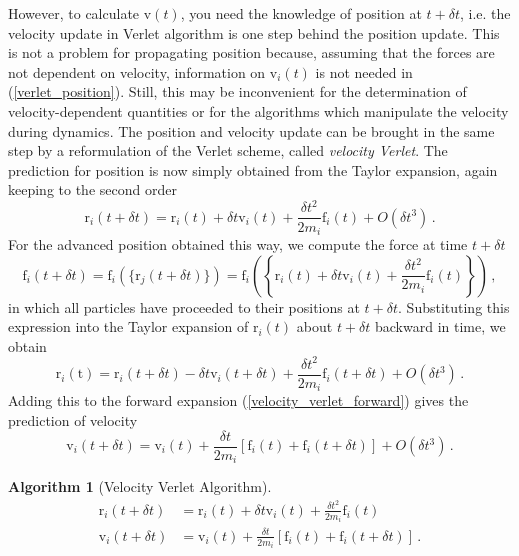 \documentclass{article}
\theoremstyle{plain}\theoremheaderfont{\normalfont\itshape}\theorembodyfont{\rmfamily}\theoremseparator{.}\newtheorem*{rem}{Remark}\newtheorem*{ex}{Example}\newtheorem*{proof}{Proof}\newtheorem*{altp}{Alternative proof}
\theoremstyle{plain}\theoremheaderfont{\normalfont\bfseries}\theorembodyfont{\rmfamily}\theoremseparator{.}\newtheorem{thm}{Theorem}[section]\newtheorem{lem}[thm]{Lemma}\newtheorem{prop}[thm]{Proposition}\newtheorem*{cor}{Corollary}\newtheorem{defn}[thm]{Definition}\newtheorem{clm}[thm]{Claim}\newtheorem{clminproof}{Claim}\newtheorem{alg}[thm]{Algorithm}\newtheorem{hyp}[thm]{Hypothesis}\newtheorem{law}[thm]{Law}
\theoremstyle{break}\theoremheaderfont{\normalfont\itshape}\theorembodyfont{\rmfamily}\theoremseparator{.\medskip}\newtheorem*{proofskip}{Proof}\newtheorem*{exs}{Examples}\newtheorem*{rems}{Remarks}
\theoremstyle{break}\theoremheaderfont{\normalfont\bfseries}\theorembodyfont{\rmfamily}\theoremseparator{.\medskip}\newtheorem{lemskip}[thm]{Lemma}\newtheorem{defnskip}[thm]{Definition}\newtheorem{propskip}[thm]{Proposition}\newtheorem{thmskip}[thm]{Theorem}
\numberwithin{equation}{section}
\newcommand{\vb}[1]{\bm{\mathrm{#1}}}
\begin{document}
    However, to calculate \(\vb{v}(t)\), you need the knowledge of position at \(t+\delta t\), i.e. the velocity update in Verlet algorithm is one step behind the position update. This is not a problem for propagating position because, assuming that the forces are not dependent on velocity, information on \(\vb{v}_i(t)\) is not needed in (\cref{verlet_position}). Still, this may be inconvenient for the determination of velocity-dependent quantities or for the algorithms which manipulate the velocity during dynamics. The position and velocity update can be brought in the same step by a reformulation of the Verlet scheme, called \textit{velocity Verlet}. The prediction for position is now simply obtained from the Taylor expansion, again keeping to the second order
    \begin{equation}\label{velocity_verlet_forward}
        \vb{r}_i(t+\delta t)=\vb{r}_i(t)+\delta t\vb{v}_i(t)+\frac{\delta t^2}{2m_i}\vb{f}_i(t)+O(\delta t^3)\,.
    \end{equation}
    For the advanced position obtained this way, we compute the force at time \(t+\delta t\)
    \begin{equation}
        \vb{f}_i(t+\delta t)=\vb{f}_i(\{\vb{r}_j(t+\delta t)\})=\vb{f}_i\left(\left\{\vb{r}_i(t)+\delta t\vb{v}_i(t)+\frac{\delta t^2}{2m_i}\vb{f}_i(t)\right\}\right)\,,
    \end{equation}
    in which all particles have proceeded to their positions at \(t+\delta t\). Substituting this expression into the Taylor expansion of \(\vb{r}_i(t)\) about \(t+\delta t\) backward in time, we obtain
    \begin{equation}
        \vb{r}_i(\vb{t})=\vb{r}_i(t+\delta t)-\delta t\vb{v}_i(t+\delta t)+\frac{\delta t^2}{2m_i}\vb{f}_i(t+\delta t)+O(\delta t^3)\,.
    \end{equation}
    Adding this to the forward expansion (\ref{velocity_verlet_forward}) gives the prediction of velocity
    \begin{equation}
        \vb{v}_i(t+\delta t)=\vb{v}_i(t)+\frac{\delta t}{2m_i}[\vb{f}_i(t)+\vb{f}_i(t+\delta t)]+O(\delta t^3)\,.
    \end{equation}

    \begin{alg}[Velocity Verlet Algorithm]
        \begin{align}
            \vb{r}_i(t+\delta t)&=\vb{r}_i(t)+\delta t\vb{v}_i(t)+\frac{\delta t^2}{2m_i}\vb{f}_i(t)\label{velocity_verlet_position}\\
            \vb{v}_i(t+\delta t)&=\vb{v}_i(t)+\frac{\delta t}{2m_i}[\vb{f}_i(t)+\vb{f}_i(t+\delta t)]\,.
        \end{align}
    \end{alg}
\end{document}
